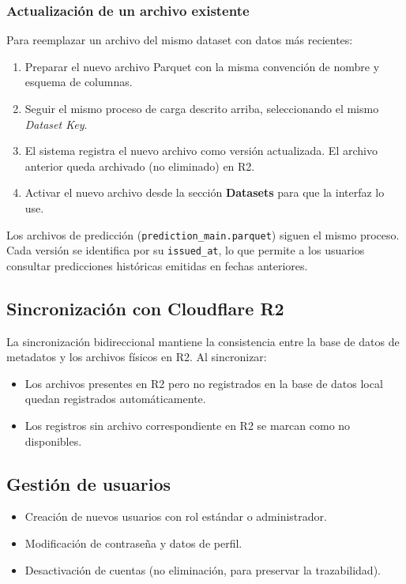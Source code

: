 \subsubsection{Actualización de un archivo existente}

Para reemplazar un archivo del mismo dataset con datos más recientes:
\begin{enumerate}
    \item Preparar el nuevo archivo Parquet con la misma convención de nombre y esquema de columnas.
    \item Seguir el mismo proceso de carga descrito arriba, seleccionando el mismo \textit{Dataset Key}.
    \item El sistema registra el nuevo archivo como versión actualizada. El archivo anterior queda archivado (no eliminado) en R2.
    \item Activar el nuevo archivo desde la sección \textbf{Datasets} para que la interfaz lo use.
\end{enumerate}

\begin{remark}
Los archivos de predicción (\texttt{prediction\_main.parquet}) siguen el mismo proceso. Cada versión se identifica por su \texttt{issued\_at}, lo que permite a los usuarios consultar predicciones históricas emitidas en fechas anteriores.
\end{remark}

\subsection{Sincronización con Cloudflare R2}

La sincronización bidireccional mantiene la consistencia entre la base de datos de metadatos y los archivos físicos en R2. Al sincronizar:
\begin{itemize}
    \item Los archivos presentes en R2 pero no registrados en la base de datos local quedan registrados automáticamente.
    \item Los registros sin archivo correspondiente en R2 se marcan como no disponibles.
\end{itemize}

\subsection{Gestión de usuarios}

\begin{itemize}
    \item Creación de nuevos usuarios con rol estándar o administrador.
    \item Modificación de contraseña y datos de perfil.
    \item Desactivación de cuentas (no eliminación, para preservar la trazabilidad).
\end{itemize}
